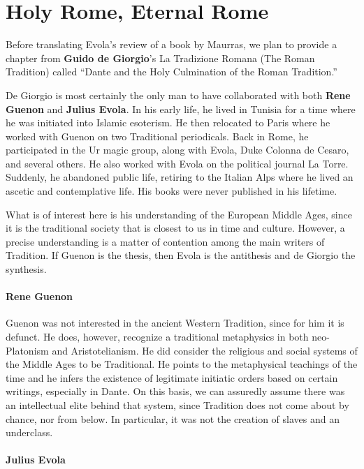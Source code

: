 \section{Holy Rome, Eternal Rome}

Before translating Evola's review of a book by Maurras, we plan to provide a chapter from \textbf{Guido de Giorgio}'s La Tradizione Romana (The Roman Tradition) called ``Dante and the Holy Culmination of the Roman Tradition.''

De Giorgio is most certainly the only man to have collaborated with both \textbf{Rene Guenon} and \textbf{Julius Evola}. In his early life, he lived in Tunisia for a time where he was initiated into Islamic esoterism. He then relocated to Paris where he worked with Guenon on two Traditional periodicals. Back in Rome, he participated in the Ur magic group, along with Evola, Duke Colonna de Cesaro, and several others. He also worked with Evola on the political journal La Torre. Suddenly, he abandoned public life, retiring to the Italian Alps where he lived an ascetic and contemplative life. His books were never published in his lifetime.

What is of interest here is his understanding of the European Middle Ages, since it is the traditional society that is closest to us in time and culture. However, a precise understanding is a matter of contention among the main writers of Tradition. If Guenon is the thesis, then Evola is the antithesis and de Giorgio the synthesis.

\paragraph{Rene Guenon}


Guenon was not interested in the ancient Western Tradition, since for him it is defunct. He does, however, recognize a traditional metaphysics in both neo-Platonism and Aristotelianism. He did consider the religious and social systems of the Middle Ages to be Traditional. He points to the metaphysical teachings of the time and he infers the existence of legitimate initiatic orders based on certain writings, especially in Dante. On this basis, we can assuredly assume there was an intellectual elite behind that system, since Tradition does not come about by chance, nor from below. In particular, it was not the creation of slaves and an underclass.

\paragraph{Julius Evola}

